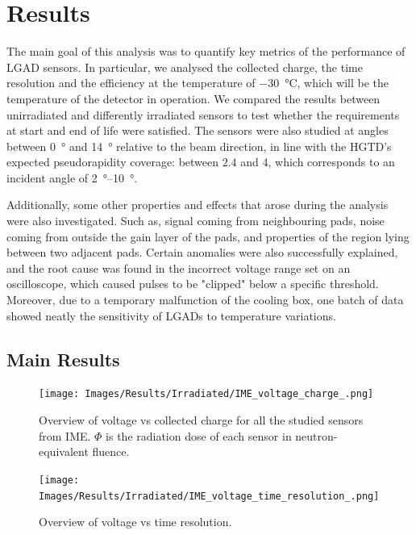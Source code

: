 \chapter{Results}\label{chap:results}

The main goal of this analysis was to quantify key metrics of the performance of LGAD sensors. In particular, we analysed the collected charge, the time resolution and the efficiency at the temperature of \qty{-30}{\degreeCelsius}, which will be the temperature of the detector in operation. We compared the results between unirradiated and differently irradiated sensors to test whether the requirements at start and end of life were satisfied. The sensors were also studied at angles between \qty{0}{\degree} and \qty{14}{\degree} relative to the beam direction, in line with the HGTD's expected pseudorapidity coverage: between \(2.4\) and \(4\), which corresponds to an incident angle of \qtyrange{2}{10}{\degree}.

Additionally, some other properties and effects that arose during the analysis were also investigated. Such as, signal coming from neighbouring pads, noise coming from outside the gain layer of the pads, and properties of the region lying between two adjacent pads. Certain anomalies were also successfully explained, and the root cause was found in the incorrect voltage range set on an oscilloscope, which caused pulses to be "clipped" below a specific threshold. Moreover, due to a temporary malfunction of the cooling box, one batch of data showed neatly the sensitivity of LGADs to temperature variations.

\section{Main Results}

\begin{figure}[h!tbp]
    \centering
    \texttt{[image: Images/Results/Irradiated/IME\_voltage\_charge\_.png]}
    \captionsetup{width=\captionwidth}
    \caption{Overview of voltage vs collected charge for all the studied sensors from IME. \(\Phi\) is the radiation dose of each sensor in neutron-equivalent fluence.}
    \label{fig:irradiated_IME_voltage_charge}
\end{figure}


\begin{figure}[h!tbp]
    \centering
    \texttt{[image: Images/Results/Irradiated/IME\_voltage\_time\_resolution\_.png]}
    \captionsetup{width=\captionwidth}
    \caption{Overview of voltage vs time resolution.}
    \label{fig:irradiated_IME_voltage_time_res}
\end{figure}

